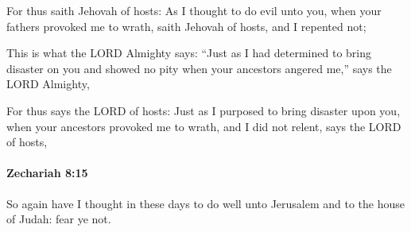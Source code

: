 			\begin{versebox}
					\item[BHS] 
					\item[LXX] 
					\item[ASV] For thus saith Jehovah of hosts: As I thought to do evil unto you, when your fathers provoked me to wrath, saith Jehovah of hosts, and I repented not;
					\item[NIV] This is what the LORD Almighty says: “Just as I had determined to bring disaster on you and showed no pity when your ancestors angered me,” says the LORD Almighty,
					\item[NRSV] For thus says the LORD of hosts: Just as I purposed to bring disaster upon you, when your ancestors provoked me to wrath, and I did not relent, says the LORD of hosts,
			\end{versebox}

		\paragraph{Zechariah 8:15} %
			\label{ZECHARIAH-8-15}

			So again have I thought in these days to do well unto Jerusalem and to the house of Judah: fear ye not.

